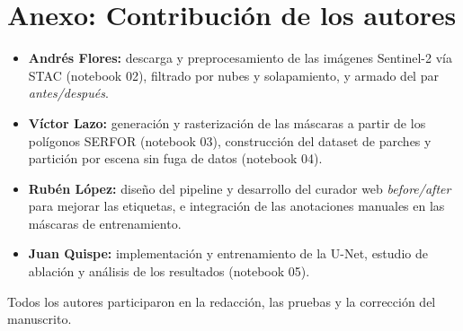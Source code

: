 \documentclass{article}
\begin{document}

\nocite{*}                  %


\appendix
\section*{Anexo: Contribución de los autores}
\begin{itemize}
    \item \textbf{Andrés Flores:} descarga y preprocesamiento de las imágenes Sentinel-2 vía STAC (notebook 02), filtrado por nubes y solapamiento, y armado del par \emph{antes/después}.
    \item \textbf{Víctor Lazo:} generación y rasterización de las máscaras a partir de los polígonos SERFOR (notebook 03), construcción del dataset de parches y partición por escena sin fuga de datos (notebook 04).
    \item \textbf{Rubén López:} diseño del pipeline y desarrollo del curador web \emph{before/after} para mejorar las etiquetas, e integración de las anotaciones manuales en las máscaras de entrenamiento.
    \item \textbf{Juan Quispe:} implementación y entrenamiento de la U-Net, estudio de ablación y análisis de los resultados (notebook 05).
\end{itemize}
Todos los autores participaron en la redacción, las pruebas y la corrección del manuscrito.

\end{document}
